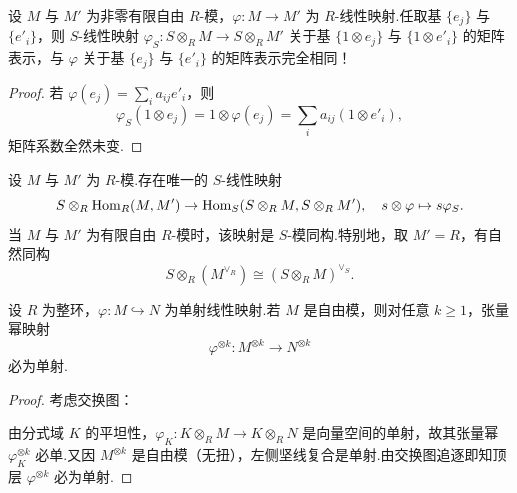 \begin{theorem}[基变换保持矩阵表示]\label{thm:base-ext-matrix}
设 $M$ 与 $M'$ 为非零有限自由 $R$-模，$\varphi \colon M \to M'$ 为 $R$-线性映射.任取基 $\{e_j\}$ 与 $\{e'_i\}$，则 $S$-线性映射 $\varphi_S \colon S \otimes_R M \to S \otimes_R M'$ 关于基 $\{1 \otimes e_j\}$ 与 $\{1 \otimes e'_i\}$ 的矩阵表示，与 $\varphi$ 关于基 $\{e_j\}$ 与 $\{e'_i\}$ 的矩阵表示完全相同！
\end{theorem}

\begin{proof}
若 $\varphi(e_j) = \sum_i a_{ij} e'_i$，则
\[
  \varphi_S(1 \otimes e_j) = 1 \otimes \varphi(e_j) = \sum_i a_{ij} (1 \otimes e'_i),
\]
矩阵系数全然未变.
\end{proof}

\begin{theorem}\label{thm:s-tensor-hom}
设 $M$ 与 $M'$ 为 $R$-模.存在唯一的 $S$-线性映射
\[
  S \otimes_R \operatorname{Hom}_R(M, M') \to \operatorname{Hom}_S(S \otimes_R M, S \otimes_R M'), \quad s \otimes \varphi \mapsto s\varphi_S.
\]
当 $M$ 与 $M'$ 为有限自由 $R$-模时，该映射是 $S$-模同构.特别地，取 $M' = R$，有自然同构
\[
  S \otimes_R (M^{\vee_R}) \cong (S \otimes_R M)^{\vee_S}.
\]
\end{theorem}

\begin{theorem}[整环上自由子模单射张量幂保持定理]\label{thm:domain-free-tensor-power-injective}
设 $R$ 为整环，$\varphi \colon M \hookrightarrow N$ 为单射线性映射.若 $M$ 是自由模，则对任意 $k \geq 1$，张量幂映射
\[
  \varphi^{\otimes k} \colon M^{\otimes k} \to N^{\otimes k}
\]
必为单射.
\end{theorem}

\begin{proof}
考虑交换图：
\begin{center}
\end{center}
由分式域 $K$ 的平坦性，$\varphi_K \colon K \otimes_R M \to K \otimes_R N$ 是向量空间的单射，故其张量幂 $\varphi_K^{\otimes k}$ 必单.又因 $M^{\otimes k}$ 是自由模（无扭），左侧坚线复合是单射.由交换图追逐即知顶层 $\varphi^{\otimes k}$ 必为单射.
\end{proof}
